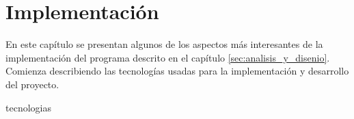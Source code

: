 %
%
%

\chapter{Implementación}
\label{sec:implementacion}

En este capítulo se presentan algunos de los aspectos más interesantes de
la implementación del programa descrito en el capítulo
\ref{sec:analisis_y_disenio}. Comienza describiendo las tecnologías
usadas para la implementación y desarrollo del proyecto.

{tecnologias}
